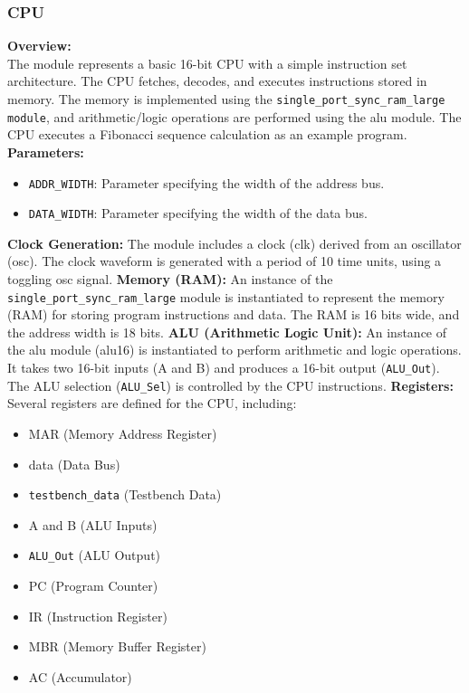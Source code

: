 \documentclass[12pt]{article}
\begin{document}
\subsubsection{CPU}
\textbf{Overview:}\\
The module represents a basic 16-bit CPU with a simple instruction set architecture. The CPU fetches, decodes, and executes instructions stored in memory. The memory is implemented using the \verb|single_port_sync_ram_large module|, and arithmetic/logic operations are performed using the alu module. The CPU executes a Fibonacci sequence calculation as an example program.
\textbf{Parameters:}\\
\begin{itemize}
    \item \verb|ADDR_WIDTH|: Parameter specifying the width of the address bus.
    \item \verb|DATA_WIDTH|: Parameter specifying the width of the data bus.
\end{itemize}
\textbf{Clock Generation:}
The module includes a clock (clk) derived from an oscillator (osc). The clock waveform is generated with a period of 10 time units, using a toggling osc signal.
\textbf{Memory (RAM):}
An instance of the \verb|single_port_sync_ram_large| module is instantiated to represent the memory (RAM) for storing program instructions and data. The RAM is 16 bits wide, and the address width is 18 bits.
\textbf{ALU (Arithmetic Logic Unit):}
An instance of the alu module (alu16) is instantiated to perform arithmetic and logic operations. It takes two 16-bit inputs (A and B) and produces a 16-bit output (\verb|ALU_Out|). The ALU selection (\verb|ALU_Sel|) is controlled by the CPU instructions.
\textbf{Registers:}
Several registers are defined for the CPU, including:
\begin{itemize}
    \item MAR (Memory Address Register)
    \item data (Data Bus)
    \item \verb|testbench_data| (Testbench Data)
    \item A and B (ALU Inputs)
    \item \verb|ALU_Out| (ALU Output)
    \item PC (Program Counter)
    \item IR (Instruction Register)
    \item MBR (Memory Buffer Register)
    \item AC (Accumulator)
\end{itemize}
\end{document}
